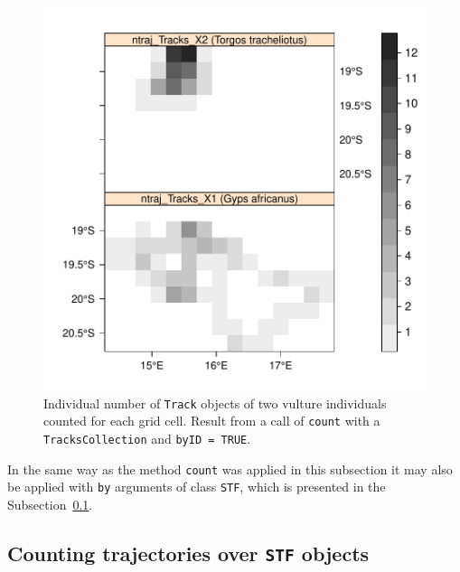 \documentclass[12pt, oneside, a4paper]{scrbook}
\newcommand{\pkg}[1]{{\normalfont\fontseries{b}\selectfont #1}}
\let\code=\texttt
\newcommand{\codeintitles}[1]{{\tt #1}} %
\begin{document}
\begin{figure}[!htb]
\centering
\includegraphics{trajagg-count_sp_vulture_TrC_fig_1}
\caption[Individual number of \code{Track} objects of two vultures counted over spatial geometries.]{Individual number of \code{Track} objects of two vulture individuals counted for each grid cell. Result from a call of \code{count} with a \code{TracksCollection} and \code{byID = TRUE}.}
\label{fig:countvulturetrcbyidoversp}
\end{figure}

\par\medskip

In the same way as the method \code{count} was applied in this subsection it  may also be applied with \code{by} arguments of class \code{STF}, which is presented in the Subsection~\ref{subsec:countoverstf}.

\par\medskip


\subsection{Counting trajectories over \codeintitles{STF} objects}
\label{subsec:countoverstf}
\end{document}
